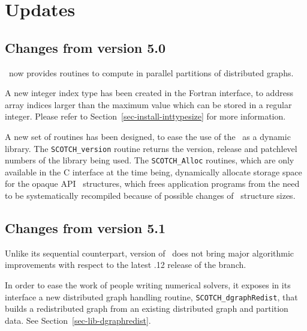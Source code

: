 
\section{Updates}
\label{sec-changes}

\subsection{Changes from version 5.0}

\ptscotch\ now provides routines to compute in
parallel partitions of distributed graphs.

A new integer index type has been created in the Fortran interface, to
address array indices larger than the maximum value which can be
stored in a regular integer. Please refer to
Section~\ref{sec-install-inttypesize} for more information.

A new set of routines has been designed, to ease the use of the
\libscotch\ as a dynamic library. The {\tt SCOTCH\_\lbt version}
routine returns the version, release and patchlevel numbers of the
library being used. The {\tt SCOTCH\_\lbt *Alloc} routines,
which are only available in the C interface at the time being,
dynamically allocate storage space for the opaque API
\scotch\ structures, which frees application programs from the need
to be systematically recompiled because of possible changes of
\scotch\ structure sizes.

\subsection{Changes from version 5.1}

Unlike its sequential counterpart, version {} of
\ptscotch\ does not bring major algorithmic improvements with respect
to the latest {.12} release of the {} branch.

In order to ease the work of people writing numerical solvers, it
exposes in its interface a new distributed graph handling routine,
{\tt SCOTCH\_\lbt dgraph\lbt Redist}, that builds a redistributed
graph from an existing distributed graph and partition data. See
Section~\ref{sec-lib-dgraphredist}.
